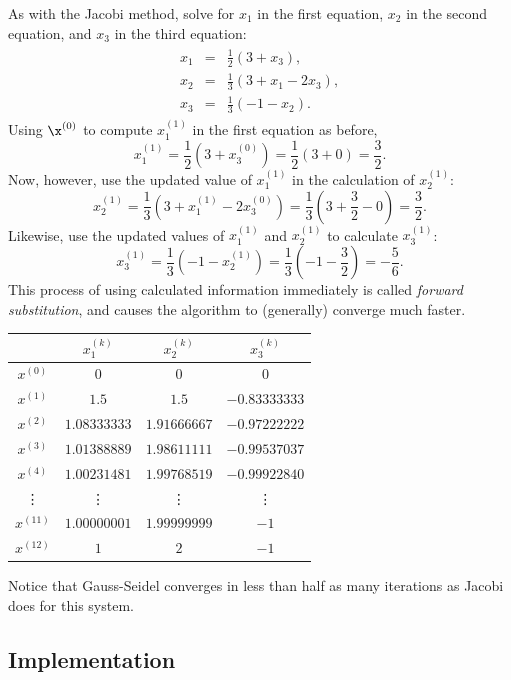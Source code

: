 As with the Jacobi method, solve for $x_1$ in the first equation, $x_2$ in the second equation, and $x_3$ in the third equation:
\begin{align*}
\begin{array}{ccc}
    x_1 & = & \frac{1}{2}(3 + x_3), \\
    x_2 & = & \frac{1}{3}(3 + x_1 - 2x_3), \\
    x_3 & = & \frac{1}{3}(-1 - x_2).
\end{array}
\end{align*}
Using $\x^{(0)}$ to compute $x^{(1)}_1$ in the first equation as before,
\[x^{(1)}_1 = \frac{1}{2}(3 + x^{(0)}_3) = \frac{1}{2}(3 + 0) = \frac{3}{2}.\]
Now, however, use the updated value of $x^{(1)}_1$ in the calculation of $x^{(1)}_2$:
\[x^{(1)}_2 = \frac{1}{3}(3 + x^{(1)}_1 - 2x^{(0)}_3) = \frac{1}{3}(3 + \frac{3}{2} - 0) = \frac{3}{2}.\]
Likewise, use the updated values of $x^{(1)}_1$ and $x^{(1)}_2$ to calculate $x^{(1)}_3$:
\[x^{(1)}_3 = \frac{1}{3}(-1 - x^{(1)}_2) = \frac{1}{3}(-1 - \frac{3}{2}) = -\frac{5}{6}.\]
This process of using calculated information immediately is called \emph{forward substitution}, and causes the algorithm to (generally) converge much faster.

\begin{center}
\begin{tabular}{c|ccc}
    & $x^{(k)}_1$ & $x^{(k)}_2$ & $x^{(k)}_3$ \\
    \hline
      $x^{(0)}$ & $0$ & $0$ & $0$ \\
      $x^{(1)}$ & $1.5$ & $1.5$ & $-0.83333333$ \\
      $x^{(2)}$ & $1.08333333$ & $1.91666667$ & $-0.97222222$ \\
      $x^{(3)}$ & $1.01388889$ & $1.98611111$ & $-0.99537037$ \\
      $x^{(4)}$ & $1.00231481$ & $1.99768519$ & $-0.99922840$ \\
      \vdots    & \vdots       & \vdots       & \vdots     \\
      $x^{(11)}$ & $1.00000001$ & $1.99999999$ & $-1$ \\
      $x^{(12)}$ & $1$ & $2$ & $-1$ \\
\end{tabular}
\end{center}
Notice that Gauss-Seidel converges in less than half as many iterations as Jacobi does for this system.

\subsection*{Implementation} %

